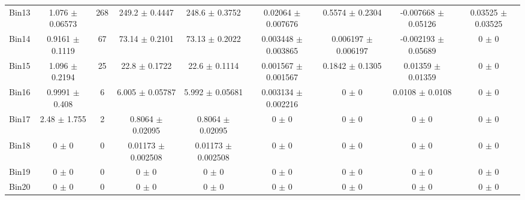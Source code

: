 \begin{tabular}{@{\extracolsep{4pt}}lcccccccc@{}}
     Bin13 & 1.076 $\pm$ 0.06573 & 268 & 249.2 $\pm$ 0.4447 & 248.6 $\pm$ 0.3752 & 0.02064 $\pm$ 0.007676 & 0.5574 $\pm$ 0.2304 & -0.007668 $\pm$ 0.05126 & 0.03525 $\pm$ 0.03525 \\ 
     Bin14 & 0.9161 $\pm$ 0.1119 & 67 & 73.14 $\pm$ 0.2101 & 73.13 $\pm$ 0.2022 & 0.003448 $\pm$ 0.003865 & 0.006197 $\pm$ 0.006197 & -0.002193 $\pm$ 0.05689 & 0 $\pm$ 0 \\ 
     Bin15 & 1.096 $\pm$ 0.2194 & 25 & 22.8 $\pm$ 0.1722 & 22.6 $\pm$ 0.1114 & 0.001567 $\pm$ 0.001567 & 0.1842 $\pm$ 0.1305 & 0.01359 $\pm$ 0.01359 & 0 $\pm$ 0 \\ 
     Bin16 & 0.9991 $\pm$ 0.408 & 6 & 6.005 $\pm$ 0.05787 & 5.992 $\pm$ 0.05681 & 0.003134 $\pm$ 0.002216 & 0 $\pm$ 0 & 0.0108 $\pm$ 0.0108 & 0 $\pm$ 0 \\ 
     Bin17 & 2.48 $\pm$ 1.755 & 2 & 0.8064 $\pm$ 0.02095 & 0.8064 $\pm$ 0.02095 & 0 $\pm$ 0 & 0 $\pm$ 0 & 0 $\pm$ 0 & 0 $\pm$ 0 \\ 
     Bin18 & 0 $\pm$ 0 & 0 & 0.01173 $\pm$ 0.002508 & 0.01173 $\pm$ 0.002508 & 0 $\pm$ 0 & 0 $\pm$ 0 & 0 $\pm$ 0 & 0 $\pm$ 0 \\ 
     Bin19 & 0 $\pm$ 0 & 0 & 0 $\pm$ 0 & 0 $\pm$ 0 & 0 $\pm$ 0 & 0 $\pm$ 0 & 0 $\pm$ 0 & 0 $\pm$ 0 \\ 
     Bin20 & 0 $\pm$ 0 & 0 & 0 $\pm$ 0 & 0 $\pm$ 0 & 0 $\pm$ 0 & 0 $\pm$ 0 & 0 $\pm$ 0 & 0 $\pm$ 0 \\ 
\hline\hline
  \end{tabular}
